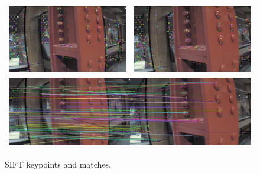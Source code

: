 \documentclass{acmsiggraph}
\begin{document}
\begin{figure}[h]
  \centering
  \begin{tabular}{cc}
    \includegraphics[resolution=150, scale=0.75]{images/sift-kp1} &
    \includegraphics[resolution=150, scale=0.75]{images/sift-kp2} \\
    \multicolumn{2}{c}{\includegraphics[resolution=150, scale=0.77]{images/sift-matches}}
  \end{tabular}
  \caption{SIFT keypoints and matches.}
  \label{fig:sift-ex}
\end{figure}
\end{document}
